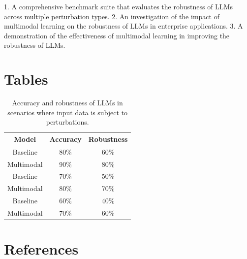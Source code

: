 \documentclass{article}
\begin{document}
1. A comprehensive benchmark suite that evaluates the robustness of LLMs across multiple perturbation types.
2. An investigation of the impact of multimodal learning on the robustness of LLMs in enterprise applications.
3. A demonstration of the effectiveness of multimodal learning in improving the robustness of LLMs.

\section{Tables}

\begin{table}[ht]
\centering
\begin{tabular}{|c|c|c|}
\hline
Model & Accuracy & Robustness \\
\hline
Baseline & 80\% & 60\% \\
\hline
Multimodal & 90\% & 80\% \\
\hline
Baseline & 70\% & 50\% \\
\hline
Multimodal & 80\% & 70\% \\
\hline
Baseline & 60\% & 40\% \\
\hline
Multimodal & 70\% & 60\% \\
\hline
\end{tabular}
\caption{Accuracy and robustness of LLMs in scenarios where input data is subject to perturbations.}
\end{table}

\section{References}



\end{document}
